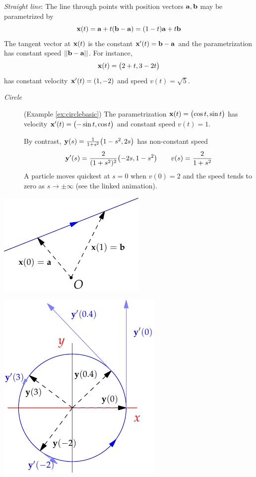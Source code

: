 \begin{minipage}[t]{0.69\linewidth}\vspace{0pt}
	\begin{examples}{}{}
		\hangindent\leftmargini
		\emph{Straight line}: The line through points with position vectors ${\mathbf{a}},{\mathbf{b}}$ may be parametrized by
		\[
			{\mathbf{x}}(t)={\mathbf{a}}+t({\mathbf{b}}-{\mathbf{a}})=(1-t){\mathbf{a}}+t{\mathbf{b}}
		\]
		The tangent vector at ${\mathbf{x}}(t)$ is the constant ${\mathbf{x}}'(t)={\mathbf{b}}-{\mathbf{a}}$ and the parametrization has constant speed $\left| \left| {\mathbf{b}}-{\mathbf{a}}\right|\right|$. For instance,
		\[
			{\mathbf{x}}(t)=\bigl(2+t,3-2t\bigr)
		\]
		has constant velocity ${\mathbf{x}}'(t)=(1,-2)$ and speed $v(t)=\sqrt 5$.
		\begin{description}
		  \item[\normalfont\emph{Circle}] (Example \ref{ex:circlebasic}) The parametrization ${\mathbf{x}}(t)=\bigl(\cos t,\sin t\bigr)$ has velocity ${\mathbf{x}}'(t)=\bigl(-\sin t,\cos t\bigr)$ and constant speed $v(t)=1$.\par
		  By contrast, ${\mathbf{y}}(s)=\tfrac 1{1+s^2}\bigl(1-s^2,2s\bigr)$ has non-constant speed
		  \[
		  	{\mathbf{y}}'(s)=\frac 2{(1+s^2)^2}\bigl(-2s,1-s^2\bigr)\qquad v(s)=\frac 2{1+s^2}
		  \]
		  A particle moves quickest at $s=0$ when $v(0)=2$ and the speed tends to zero as $s\to\pm\infty$ (see the linked animation).
		\end{description}
	\end{examples}
\end{minipage}
\hfill
\begin{minipage}[t]{0.3\linewidth}\vspace{0pt}
	\flushright \includegraphics{curves-line}\par
	\flushright	\href{http://www.math.uci.edu/~ndonalds/math162a/curves-animcircle.html}{\includegraphics{curves-animcircle2}}
\end{minipage}

